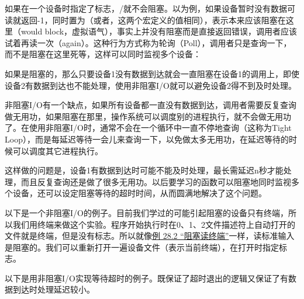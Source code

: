 如果在一个设备时指定了标志，/就不会阻塞。以为例，如果设备暂时没有数据可读就返回-1，同时置为（或者，这两个宏定义的值相同），表示本来应该阻塞在这里（would block，虚拟语气），事实上并没有阻塞而是直接返回错误，调用者应该试着再读一次（again）。这种行为方式称为轮询（Poll），调用者只是查询一下，而不是阻塞在这里死等，这样可以同时监视多个设备：




如果是阻塞的，那么只要设备1没有数据到达就会一直阻塞在设备1的调用上，即使设备2有数据到达也不能处理，使用非阻塞I/\BookSplit{}O就可以避免设备2得不到及时处理。



非阻塞I/\BookSplit{}O有一个缺点，如果所有设备都一直没有数据到达，调用者需要反复查询做无用功，如果阻塞在那里，操作系统可以调度别的进程执行，就不会做无用功了。在使用非阻塞I/\BookSplit{}O时，通常不会在一个循环中一直不停地查询（这称为Tight Loop），而是每延迟等待一会儿来查询一下，以免做太多无用功，在延迟等待的时候可以调度其它进程执行。




这样做的问题是，设备1有数据到达时可能不能及时处理，最长需延迟n秒才能处理，而且反复查询还是做了很多无用功。以后要学习的函数可以阻塞地同时监视多个设备，还可以设定阻塞等待的超时时间，从而圆满地解决了这个问题。



以下是一个非阻塞I/\BookSplit{}O的例子。目前我们学过的可能引起阻塞的设备只有终端，所以我们用终端来做这个实验。程序开始执行时在0、1、2文件描述符上自动打开的文件就是终端，但是没有标志。所以就像\hyperlink{db.ch28s04.id2852428}{例 28.\BookSplit{}2 “阻塞读终端”}一样，读标准输入是阻塞的。我们可以重新打开一遍设备文件（表示当前终端），在打开时指定标志。





以下是用非阻塞I/\BookSplit{}O实现等待超时的例子。既保证了超时退出的逻辑又保证了有数据到达时处理延迟较小。


